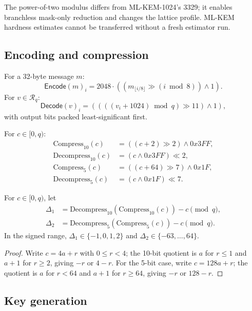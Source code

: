 \documentclass[runningheads]{llncs}
\newcommand{\Ring}{\mathcal{R}_q}
\newcommand{\Encode}{\mathsf{Encode}}
\newcommand{\Decode}{\mathsf{Decode}}
\newcommand{\Compress}{\mathrm{Compress}}
\newcommand{\Decompress}{\mathrm{Decompress}}
\begin{document}
The power-of-two modulus differs from ML-KEM-1024's 3329; it enables
branchless mask-only reduction and changes the lattice profile.  ML-KEM
hardness estimates cannot be transferred without a fresh estimator run.

\subsection{Encoding and compression}

\begin{definition}
For a 32-byte message $m$:
\[
 \Encode(m)_i=2048\cdot((m_{\lfloor i/8\rfloor}\gg(i\bmod8))\land1).
\]
For $v\in\Ring$:
\[
 \Decode(v)_i=
 \left(\left(((v_i+1024)\bmod q)\gg11\right)\land1\right),
\]
with output bits packed least-significant first.
\end{definition}

\begin{definition}[Compression]
For $c\in[0,q)$:
\[
 \begin{aligned}
 \Compress_{10}(c)&=((c+2)\gg2)\land0x3FF,\\
 \Decompress_{10}(c)&=(c\land0x3FF)\ll2,\\
 \Compress_5(c)&=((c+64)\gg7)\land0x1F,\\
 \Decompress_5(c)&=(c\land0x1F)\ll7.
 \end{aligned}
\]
\end{definition}

\begin{lemma}
For $c\in[0,q)$, let
\[
\begin{aligned}
 \Delta_1&=\Decompress_{10}(\Compress_{10}(c))-c\pmod q,\\
 \Delta_2&=\Decompress_5(\Compress_5(c))-c\pmod q.
\end{aligned}
\]
In the signed range, $\Delta_1\in\{-1,0,1,2\}$ and
$\Delta_2\in\{-63,\ldots,64\}$.
\end{lemma}

\begin{proof}
Write $c=4a+r$ with $0\le r<4$; the 10-bit quotient is $a$ for $r\le1$
and $a+1$ for $r\ge2$, giving $-r$ or $4-r$.  For the 5-bit case,
write $c=128a+r$; the quotient is $a$ for $r<64$ and $a+1$ for
$r\ge64$, giving $-r$ or $128-r$.
\end{proof}

\subsection{Key generation}
\end{document}
